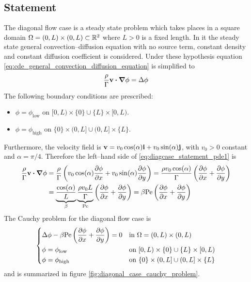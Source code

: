 
\subsection{Statement}

The diagonal flow case is a steady state problem which takes places in a square domain $\Omega = (0,L) \times (0,L) \subset \mathbb{R}^2$ where $L > 0$ is a fixed length. In it the steady state general convection--diffusion equation with no source term, constant density and constant diffusion coefficient is considered. Under these hypothesis equation \eqref{eq:cde_general_convection_diffusion_equation} is simplified to
\begin{equation} \label{eq:diagcase_statement_pde1}
	\frac{\rho}{\Gamma} \vb{v} \vdot \grad{\phi} = \Delta{\phi}
\end{equation}
The following boundary conditions are prescribed:
\begin{itemize}[topsep=0pt]
	\item $\phi = \phi_\text{low}$ on $[0,L) \times \{ 0 \} \cup \{ L \} \times [0,L)$.
	\item $\phi = \phi_\text{high}$ on $\{ 0 \} \times (0,L] \cup (0,L] \times \{ L \}$.
\end{itemize}
Furthermore, the velocity field is $\vb{v} = v_0 \cos(\alpha) \vb{i} + v_0 \sin(\alpha) \vb{j}$, with $v_0 > 0$ constant and $\alpha = \pi / 4$. Therefore the left--hand side of \eqref{eq:diagcase_statement_pde1} is
\begin{align}
	\frac{\rho}{\Gamma} \vb{v} \vdot \grad{\phi} &= 
	\frac{\rho}{\Gamma} 
	\left( v_0 \cos(\alpha) \pdv{\phi}{x} + v_0 \sin(\alpha) \pdv{\phi}{y} \right) = 
	\frac{\rho v_0 \cos(\alpha)}{\Gamma} \left( \pdv{\phi}{x} + \pdv{\phi}{y} \right) \\
	&= 
	\underbrace{\frac{\cos(\alpha)}{L}}_{\beta} 
	\underbrace{\frac{\rho v_0 L}{\Gamma}}_{\mathrm{Pe}} 
	\left( \pdv{\phi}{x} + \pdv{\phi}{y} \right) = 
	\beta \mathrm{Pe} \left( \pdv{\phi}{x} + \pdv{\phi}{y} \right)
\end{align}
The Cauchy problem for the diagonal flow case is
\begin{equation} \label{eq:diagonal_case_cauchy_problem}
	\left\{
	\begin{aligned}
		&\Delta \phi - \beta \mathrm{Pe} \left( \pdv{\phi}{x} + \pdv{\phi}{y} \right) = 0 &
		&\text{in } \Omega = (0,L) \times (0,L) \\
		&\phi = \phi_\text{low} &
		&\text{on } [0,L) \times \{ 0 \} \cup \{ L \} \times [0,L) \\
		&\phi = \phi_\text{high} &
		&\text{on } \{ 0 \} \times (0,L] \cup (0,L] \times \{ L \}
	\end{aligned}
	\right.
\end{equation}
and is summarized in figure \ref{fig:diagonal_case_cauchy_problem}.

